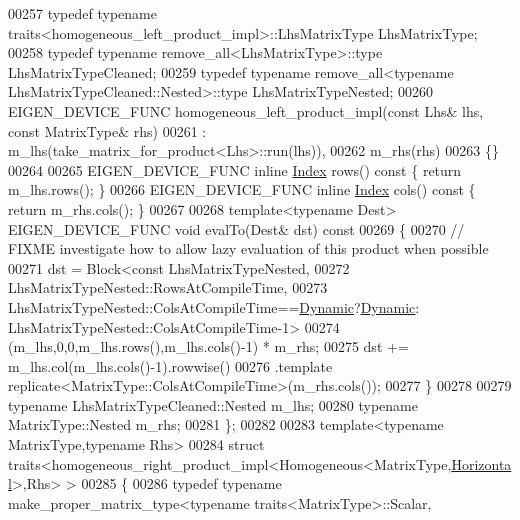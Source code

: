 \begin{DoxyCode}
00257   \textcolor{keyword}{typedef} \textcolor{keyword}{typename} traits<homogeneous\_left\_product\_impl>::LhsMatrixType LhsMatrixType;
00258   \textcolor{keyword}{typedef} \textcolor{keyword}{typename} remove\_all<LhsMatrixType>::type LhsMatrixTypeCleaned;
00259   \textcolor{keyword}{typedef} \textcolor{keyword}{typename} remove\_all<typename LhsMatrixTypeCleaned::Nested>::type LhsMatrixTypeNested;
00260   EIGEN\_DEVICE\_FUNC homogeneous\_left\_product\_impl(\textcolor{keyword}{const} Lhs& lhs, \textcolor{keyword}{const} MatrixType& rhs)
00261     : m\_lhs(take\_matrix\_for\_product<Lhs>::run(lhs)),
00262       m\_rhs(rhs)
00263   \{\}
00264 
00265   EIGEN\_DEVICE\_FUNC \textcolor{keyword}{inline} \hyperlink{namespace_eigen_a62e77e0933482dafde8fe197d9a2cfde}{Index} rows()\textcolor{keyword}{ const }\{ \textcolor{keywordflow}{return} m\_lhs.rows(); \}
00266   EIGEN\_DEVICE\_FUNC \textcolor{keyword}{inline} \hyperlink{namespace_eigen_a62e77e0933482dafde8fe197d9a2cfde}{Index} cols()\textcolor{keyword}{ const }\{ \textcolor{keywordflow}{return} m\_rhs.cols(); \}
00267 
00268   \textcolor{keyword}{template}<\textcolor{keyword}{typename} Dest> EIGEN\_DEVICE\_FUNC \textcolor{keywordtype}{void} evalTo(Dest& dst)\textcolor{keyword}{ const}
00269 \textcolor{keyword}{  }\{
00270     \textcolor{comment}{// FIXME investigate how to allow lazy evaluation of this product when possible}
00271     dst = Block<\textcolor{keyword}{const} LhsMatrixTypeNested,
00272               LhsMatrixTypeNested::RowsAtCompileTime,
00273               LhsMatrixTypeNested::ColsAtCompileTime==\hyperlink{namespace_eigen_ad81fa7195215a0ce30017dfac309f0b2}{Dynamic}?\hyperlink{namespace_eigen_ad81fa7195215a0ce30017dfac309f0b2}{Dynamic}:
      LhsMatrixTypeNested::ColsAtCompileTime-1>
00274             (m\_lhs,0,0,m\_lhs.rows(),m\_lhs.cols()-1) * m\_rhs;
00275     dst += m\_lhs.col(m\_lhs.cols()-1).rowwise()
00276             .template replicate<MatrixType::ColsAtCompileTime>(m\_rhs.cols());
00277   \}
00278 
00279   \textcolor{keyword}{typename} LhsMatrixTypeCleaned::Nested m\_lhs;
00280   \textcolor{keyword}{typename} MatrixType::Nested m\_rhs;
00281 \};
00282 
00283 \textcolor{keyword}{template}<\textcolor{keyword}{typename} MatrixType,\textcolor{keyword}{typename} Rhs>
00284 \textcolor{keyword}{struct }traits<homogeneous\_right\_product\_impl<Homogeneous<MatrixType,\hyperlink{group__enums_ggad49a7b3738e273eb00932271b36127f7aae8a16b3b9272683c1162915f6d892be}{Horizontal}>,Rhs> >
00285 \{
00286   \textcolor{keyword}{typedef} \textcolor{keyword}{typename} make\_proper\_matrix\_type<typename traits<MatrixType>::Scalar,

\end{DoxyCode}
